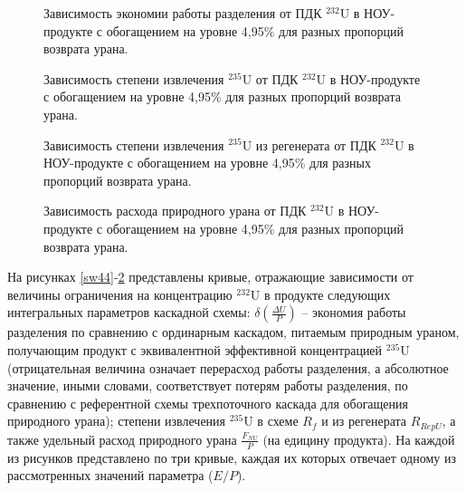 \begin{figure}
    \centering
    \begin{minipage}{.5\textwidth}
      \centering
      
\caption{{Зависимость экономии работы разделения от ПДК $^{232}$U в НОУ-продукте с обогащением на уровне 4,95\% для разных пропорций возврата урана.{\label{sw495}}}}
    \end{minipage}%
    \begin{minipage}{.5\textwidth}
      \centering
      
\caption{{Зависимость степени извлечения $^{235}$U от ПДК $^{232}$U в НОУ-продукте с обогащением на уровне 4,95\% для разных пропорций возврата урана.{\label{ex495}}}}
\end{minipage}
\end{figure}

\begin{figure}
    \centering
    \begin{minipage}{.5\textwidth}
      \centering
      
\caption{{Зависимость степени извлечения $^{235}$U из регенерата от ПДК $^{232}$U в НОУ-продукте с обогащением на уровне 4,95\% для разных пропорций возврата урана.{\label{exR495}}}}
    \end{minipage}%
    \begin{minipage}{.5\textwidth}
      \centering
      
\caption{{Зависимость расхода природного урана от ПДК $^{232}$U в НОУ-продукте с обогащением на уровне 4,95\% для разных пропорций возврата урана.{\label{F0R495}}}}
\end{minipage}
\end{figure}

    
На рисунках \ref{sw44}-\ref{F0R495} представлены кривые, отражающие зависимости от величины ограничения на концентрацию $^{232}$U в продукте следующих интегральных параметров каскадной схемы: $\delta(\frac{\Delta U}{P})$ -- экономия работы разделения по сравнению с ординарным каскадом, питаемым природным ураном, получающим продукт с эквивалентной эффективной концентрацией $^{235}$U (отрицательная величина означает перерасход работы разделения, а абсолютное значение, иными словами, соответствует потерям работы разделения, по сравнению с референтной схемы трехпоточного каскада для обогащения природного урана); степени извлечения $^{235}$U в схеме $R_f$ и из регенерата $R_{RepU}$, а также удельный расход природного урана $\frac{F_{NU}}{P}$ (на едицину продукта). На каждой из рисунков представлено по три кривые, каждая их которых отвечает одному из рассмотренных значений параметра ($E/P$).

